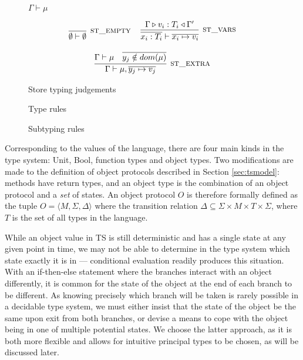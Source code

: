 \documentclass[preprint]{sigplanconf}
\newcommand{\secref}[1]{Section \ref{#1}}
\newcommand{\typerule}[4]{#1 \triangleright #2 : #3 \triangleleft #4}
\begin{document}
\begin{figure}
\begin{ottdefnblock}
{$\Gamma  \vdash  \mu$}
{}
\end{ottdefnblock}

\[
\begin{tabular}{cc}
\infer[\textsc{st\_empty}]
{\emptyset \vdash \emptyset}
{}
&
\infer[\textsc{st\_vars}]
{\overline{x_i : T_i} \vdash \overline{x_i \mapsto v_i}}
{\typerule{\Gamma}{v_i}{T_i}{\Gamma'}}
\\\\
\multicolumn{2}{c}{
\infer[\textsc{st\_extra}]
{\Gamma \vdash \mu, \overline{y_j \mapsto v_j}}
{\Gamma \vdash \mu & \overline{y_j \notin dom(\mu)}}
}
\end{tabular}
\]

\caption{\label{fig:storetype} Store typing judgements}
\end{figure}

\begin{figure}
\ottdefnmethtype

\ottdefntype

\caption{\label{fig:typerules} Type rules}
\end{figure}

\begin{figure}

\ottdefnsubtype

\caption{\label{fig:subtyperules} Subtyping rules}
\end{figure}

Corresponding to the values of the language, there are four main kinds
in the type system: Unit, Bool, function types and object types. 
Two modifications are made to the definition of object protocols described
in \secref{sec:tsmodel}: methods have return types, and an object type
is the combination of an object protocol and a {\it set} of states.
An object protocol $O$ is therefore formally defined as the tuple 
$O = \langle M, \Sigma, \Delta \rangle$
where the transition relation $\Delta \subseteq \Sigma \times M \times T \times \Sigma$, 
where $T$ is the set of all types in the language.

While an object value in TS is still deterministic and has a single state at any 
given
point in time, we may not be able to determine in the type system which state 
exactly it is in --- conditional evaluation readily produces this situation.
With an if-then-else statement where the branches
interact with an object differently, it is common for the state of the object
at the end of each branch to be different. As
knowing precisely which branch will be taken is rarely possible in a
decidable type system, we must either insist that the state of the object
be the same upon exit from both branches, or devise a means to cope with
the object being in one of multiple potential states. We choose the latter
approach, as it is both more flexible and allows for intuitive principal
types to be chosen, as will be discussed later.
\end{document}
